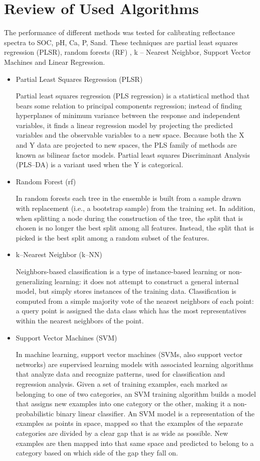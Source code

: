 \documentclass[12pt,letterpaper]{article}
\begin{document}
\section{Review of Used Algorithms}
The performance of different methods was tested for calibrating reflectance spectra to SOC, pH, Ca, P, Sand. These techniques are partial least squares regression (PLSR), random forests (RF) , k – Nearest Neighbor, Support Vector Machines and Linear Regression.
\begin{itemize}
	\item Partial Least Squares Regression (PLSR)
	
	Partial least squares regression (PLS regression) is a statistical method that bears some relation to principal components regression; instead of finding hyperplanes of minimum variance between the response and independent variables, it finds a linear regression model by projecting the predicted variables and the observable variables to a new space. Because both the X and Y data are projected to new spaces, the PLS family of methods are known as bilinear factor models. Partial least squares Discriminant Analysis (PLS--DA) is a variant used when the Y is categorical. 
	
	\item Random Forest (rf)
	
	In random forests each tree in the ensemble is built from a sample drawn with replacement (i.e., a bootstrap sample) from the training set. In addition, when splitting a node during the construction of the tree, the split that is chosen is no longer the best split among all features. Instead, the split that is picked is the best split among a random subset of the features.
	
	\item k--Nearest Neighbor (k--NN)
	
	Neighbors-based classification is a type of instance-based learning or non-generalizing learning: it does not attempt to construct a general internal model, but simply stores instances of the training data. Classification is computed from a simple majority vote of the nearest neighbors of each point: a query point is assigned the data class which has the most representatives within the nearest neighbors of the point.
	
	\item Support Vector Machines (SVM)
	
	In machine learning, support vector machines (SVMs, also support vector networks) are supervised learning models with associated learning algorithms that analyze data and recognize patterns, used for classification and regression analysis. Given a set of training examples, each marked as belonging to one of two categories, an SVM training algorithm builds a model that assigns new examples into one category or the other, making it a non-probabilistic binary linear classifier. An SVM model is a representation of the examples as points in space, mapped so that the examples of the separate categories are divided by a clear gap that is as wide as possible. New examples are then mapped into that same space and predicted to belong to a category based on which side of the gap they fall on.
	

\end{itemize}
\end{document}
